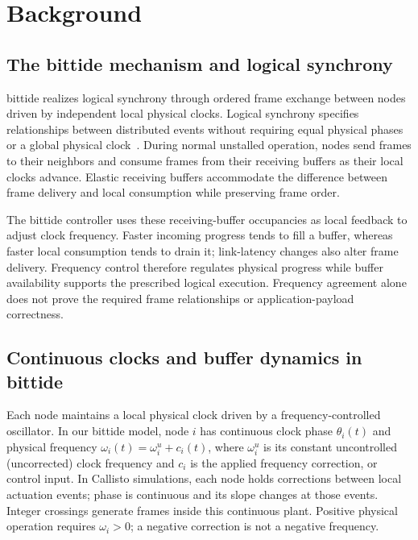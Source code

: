 \section{Background}
\label{sec:background}

\subsection{The bittide mechanism and logical synchrony}
bittide realizes logical synchrony through ordered frame exchange
between nodes driven by independent local physical clocks. Logical
synchrony specifies relationships between distributed events without
requiring equal physical phases or a global physical clock~\cite{lall2024logicalSynchrony}.
During normal unstalled operation, nodes send frames to their neighbors
and consume frames from their receiving buffers as their local clocks
advance. Elastic receiving buffers accommodate the difference between
frame delivery and local consumption while preserving frame order.

The bittide controller uses these receiving-buffer occupancies as local
feedback to adjust clock frequency. Faster incoming progress tends to
fill a buffer, whereas faster local consumption tends to drain it;
link-latency changes also alter frame delivery. Frequency control
therefore regulates physical progress while buffer availability supports
the prescribed logical execution. Frequency agreement alone does not
prove the required frame relationships or application-payload correctness.

\subsection{Continuous clocks and buffer dynamics in bittide}

Each node maintains a local physical clock driven by a frequency-controlled oscillator.
In our bittide model, node $i$ has continuous clock phase $\theta_i(t)$ and physical frequency
$\omega_i(t)=\omega_i^u+c_i(t)$, where $\omega_i^u$ is its constant
uncontrolled (uncorrected) clock frequency and $c_i$ is the
applied frequency correction, or control input. In Callisto simulations, each node holds corrections between local actuation events; phase is continuous
and its slope changes at those events. Integer crossings generate
frames inside this continuous plant. Positive physical operation
requires $\omega_i>0$; a negative correction is not a negative frequency.

